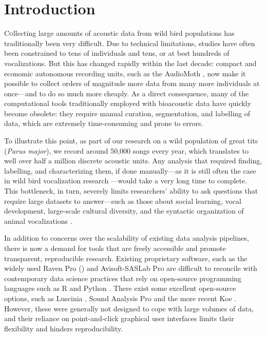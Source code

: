 \section{Introduction}

\lettrine[lines=2]Collecting large amounts of acoustic data from wild bird populations has
traditionally been very difficult. Due to technical limitations, studies have
often been constrained to tens of individuals and tens, or at best hundreds of
vocalizations. But this has changed rapidly within the last decade: compact and
economic autonomous recording units, such as the AudioMoth \parencite{hill2019}, now
make it possible to collect orders of magnitude more data from many more
individuals at once---and to do so much more cheaply. As a direct consequence,
many of the computational tools traditionally employed with bioacoustic data
have quickly become obsolete: they require manual curation, segmentation, and
labelling of data, which are extremely time-consuming and prone to errors.

To illustrate this point, as part of our research on a wild population of great
tits (\textit{Parus major}), we record around 50,000 songs every year, which
translates to well over half a million discrete acoustic units. Any analysis
that required finding, labelling, and characterizing them, if done manually---as
it is still often the case in wild bird vocalization research \parencite{beecher2020a,
demko2018, mclean2020, pipek2018, youngblood2022}---would take a very long time to
complete. This bottleneck, in turn, severely limits researchers' ability to ask
questions that require large datasets to answer---such as those about social
learning, vocal development, large-scale cultural diversity, and the syntactic
organization of animal vocalizations \parencite{aplin2019, kollmorgen2020,
lachlan2018, sainburg2019}.

In addition to concerns over the scalability of existing data analysis
pipelines, there is now a demand for tools that are freely accessible and
promote transparent, reproducible research. Existing proprietary software, such
as the widely used Raven Pro (\cite[up to \$800;][]{raven2019}) and Avisoft-SASLab Pro \parencite[up to \$2,835;][]{specht2002} are difficult to reconcile with contemporary data science practices that rely on open-source programming
languages such as R \parencite{rcoreteam2021} and Python \parencite{vanrossum1995}.
There exist some excellent open-source options, such as Luscinia
\parencite{lachlan2016a}, Sound Analysis Pro \parencite{tchernichovski2000} and the more
recent Koe \parencite{fukuzawa2020}. However, these were generally not designed to
cope with large volumes of data, and their reliance on point-and-click graphical
user interfaces limits their flexibility and hinders reproducibility.

